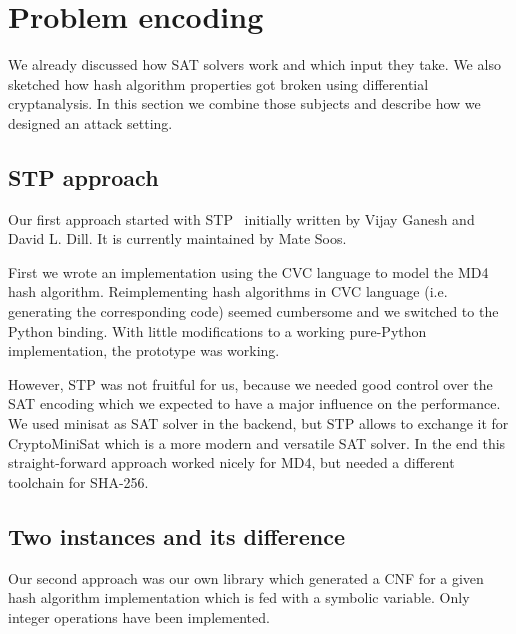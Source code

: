 \renewcommand*\chappic{img/encoding.pdf}
\renewcommand*\chapquote{There is concensus that encoding techniques usually have a dramatic impact on the efficiency of the SAT solver}
\renewcommand*\chapquotesrc{Magnus Bj\"ork}
\chapter{Problem encoding}
\label{ch:enc}

We already discussed how SAT solvers work and which input they take.
We also sketched how hash algorithm properties got broken using
differential cryptanalysis. In this section we combine those
subjects and describe how we designed an attack setting.

\section{STP approach}
\label{sec:enc-stp}
%
Our first approach started with STP~\cite{stp} initially written by Vijay Ganesh and David L. Dill.
It is currently maintained by Mate Soos.

First we wrote an implementation using the CVC language to model the MD4 hash algorithm.
Reimplementing hash algorithms in CVC language (i.e. generating the corresponding code)
seemed cumbersome and we switched to the Python binding. With little modifications to
a working pure-Python implementation, the prototype was working.

However, STP was not fruitful for us, because we needed good control over the SAT encoding
which we expected to have a major influence on the performance. We used minisat as SAT solver
in the backend, but STP allows to exchange it for CryptoMiniSat which is a more modern and
versatile SAT solver. In the end this straight-forward approach worked nicely for MD4,
but needed a different toolchain for SHA-256.

\section{Two instances and its difference}
\label{sec:enc-algotocnf}
%
Our second approach was our own library which generated a CNF for a given hash algorithm
implementation which is fed with a symbolic variable. Only integer operations have been
implemented.

